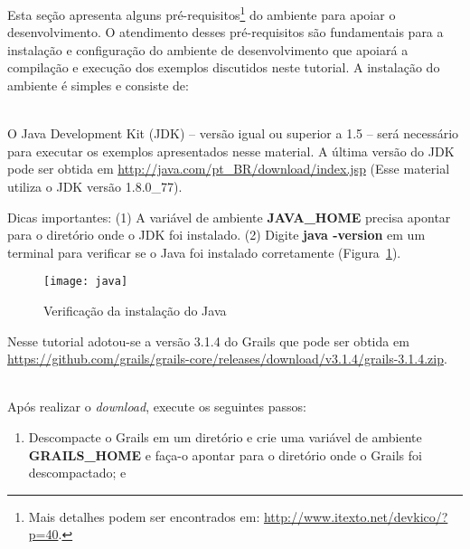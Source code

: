 {\vspace{0.3cm}

Esta  seção   apresenta  alguns  pré-requisitos\footnote{Mais detalhes podem ser
  encontrados em:  \url{http://www.itexto.net/devkico/?p=40}.}  do ambiente para
apoiar o  desenvolvimento. O atendimento desses  pré-requisitos são fundamentais
para a  instalação e configuração do  ambiente de desenvolvimento  que apoiará a
compilação e execução  dos exemplos discutidos neste tutorial.   A instalação do
ambiente é simples e consiste de: 

\hspace{1cm}\\
  O Java  Development Kit  (JDK) –
versão  igual ou  superior a  1.5 –  será necessário  para executar  os exemplos
apresentados  nesse  material.   A última  versão  do  JDK  pode ser  obtida  em
{\footnotesize\url{http://java.com/pt_BR/download/index.jsp}}   (Esse   material
utiliza o JDK versão 1.8.0\_77). 

\vspace{0.5cm}

Dicas importantes: (1)  A variável de ambiente {\bf  JAVA\_HOME} precisa apontar
para o diretório onde o JDK foi  instalado. (2) Digite {\bf java -version} em um
terminal    para   verificar    se   o    Java   foi    instalado   corretamente
(Figura~\ref{jdkFig}).

\vspace{0.5cm}

\begin{figure}[htbp]
\centering\texttt{[image: java]}
\caption{Verificação da instalação do Java}
\label{jdkFig}
\end{figure}

\newpage

  Nesse tutorial adotou-se  a versão 3.1.4
do         Grails         que         pode         ser         obtida         em
{\footnotesize\url{https://github.com/grails/grails-core/releases/download/v3.1.4/grails-3.1.4.zip}}.  
  
\hspace{1cm}\\
\noindent Após realizar o {\it download}, execute os seguintes passos:

\vspace{0.3cm}

\begin{enumerate}

  \item Descompacte  o Grails em  um diretório e  crie uma variável  de ambiente
    {\bf  GRAILS\_HOME} e  faça-o apontar  para o  diretório onde  o  Grails foi
    descompactado; e


\end{enumerate}}
